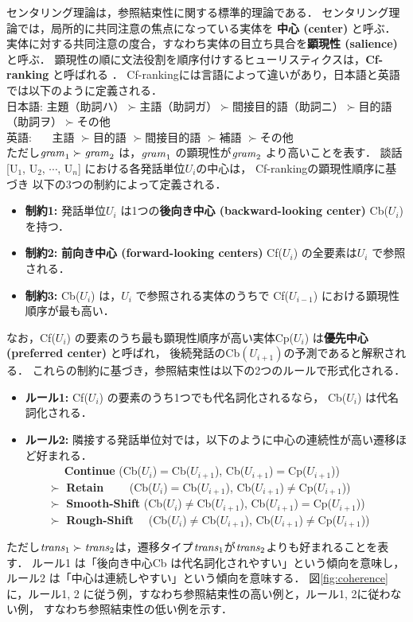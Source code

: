 \documentclass[japanese]{jnlp_1.3e}
\begin{document}
センタリング理論は，参照結束性に関する標準的理論である．
センタリング理論では，局所的に共同注意の焦点になっている実体を
{\bf 中心 (center)} と呼ぶ．
実体に対する共同注意の度合，すなわち実体の目立ち具合を{\bf 顕現性 (salience)}と呼ぶ．
顕現性の順に文法役割を順序付けするヒューリスティクスは，{\bf Cf-ranking} と呼ばれる ．
Cf-rankingには言語によって違いがあり，日本語と英語では以下のように定義される．\\
\hspace{2mm} 日本語: 主題（助詞ハ）$\succ$主語（助詞ガ）$\succ$間接目的語（助詞ニ）$\succ$目的語（助詞ヲ）$\succ$その他 \\
\hspace{2mm} 英語: ~~~主語 $\succ$目的語 $\succ$間接目的語 $\succ$補語 $\succ$その他\\
ただし${\it gram}_1 \succ {\it gram}_2$ は，${\it gram}_1$ の顕現性が${\it gram}_2$ より高いことを表す．
談話[U$_1$, U$_2$, $\cdots$, U$_n$] における各発話単位$U_i$の中心は，
Cf-rankingの顕現性順序に基づき
以下の3つの制約によって定義される．
\begin{itemize}
    \item {\bf 制約1:} 
発話単位$U_i$ は1つの{\bf 後向き中心 (backward-looking center)} Cb($U_i$) を持つ．
    \item {\bf 制約2:} 
{\bf 前向き中心 (forward-looking centers)} Cf($U_i$) の全要素は$U_i$ で参照される．
    \item {\bf 制約3:} 
Cb($U_i$) は，$U_i$ で参照される実体のうちで
Cf($U_{i-1}$) における顕現性順序が最も高い．
\end{itemize}
なお，Cf($U_i$) の要素のうち最も顕現性順序が高い実体Cp($U_i$) は{\bf 優先中心 (preferred center)} と呼ばれ，
後続発話のCb$(U_{i+1})$の予測であると解釈される．
これらの制約に基づき，参照結束性は以下の2つのルールで形式化される．
\begin{itemize}
    \item {\bf ルール1:}  
Cf($U_i$) の要素のうち1つでも代名詞化されるなら，
Cb($U_i$) は代名詞化される．
    \item {\bf ルール2:}  
隣接する発話単位対では，以下のように中心の連続性が高い遷移ほど好まれる．\\
~~~~~~~{\bf Continue} (Cb($U_i$)$=$Cb($U_{i+1}$), Cb($U_{i+1}$)$=$Cp($U_{i+1}$))\\
~~~~$\succ$ {\bf Retain} ~~~~(Cb($U_i$)$=$Cb($U_{i+1}$), Cb($U_{i+1}$)$\neq$Cp($U_{i+1}$))\\ 
~~~~$\succ$ {\bf Smooth-Shift} (Cb($U_i$)$\neq$Cb($U_{i+1}$), Cb($U_{i+1}$)$=$Cp($U_{i+1}$))\\ 
~~~~$\succ$ {\bf Rough-Shift} ~~(Cb($U_i$)$\neq$Cb($U_{i+1}$), Cb($U_{i+1}$)$\neq$Cp($U_{i+1}$))
\end{itemize}
ただし${\it trans}_1 \succ {\it trans}_2$は，遷移タイプ${\it trans}_1$が${\it trans}_2$よりも好まれることを表す．
ルール1 は「後向き中心Cb は代名詞化されやすい」という傾向を意味し，
ルール2 は「中心は連続しやすい」という傾向を意味する．
図\ref{fig:coherence} に，ルール1, 2 に従う例，すなわち参照結束性の高い例と，ルール1, 2に従わない例，
すなわち参照結束性の低い例を示す．
\end{document}
